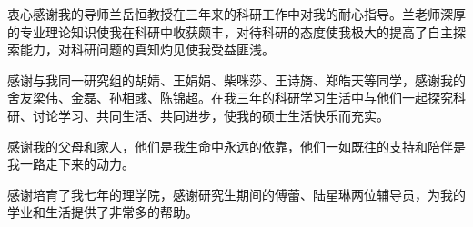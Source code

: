 \begin{acknowledgement}
  衷心感谢我的导师兰岳恒教授在三年来的科研工作中对我的耐心指导。兰老师深厚的专业理论知识使我在科研中收获颇丰，对待科研的态度使我极大的提高了自主探索能力，对科研问题的真知灼见使我受益匪浅。

  感谢与我同一研究组的胡婧、王娟娟、柴咪莎、王诗旖、郑皓天等同学，感谢我的舍友梁伟、金磊、孙相彧、陈锦超。在我三年的科研学习生活中与他们一起探究科研、讨论学习、共同生活、共同进步，使我的硕士生活快乐而充实。

  感谢我的父母和家人，他们是我生命中永远的依靠，他们一如既往的支持和陪伴是我一路走下来的动力。

  感谢培育了我七年的理学院，感谢研究生期间的傅蕾、陆星琳两位辅导员，为我的学业和生活提供了非常多的帮助。
\end{acknowledgement}
